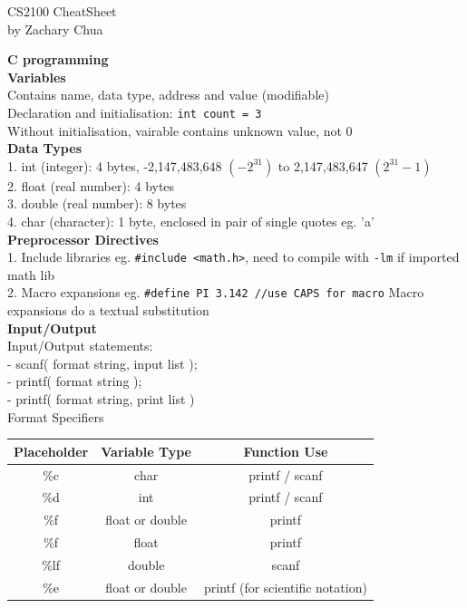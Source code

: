 \documentclass[10pt, a4paper]{article}
\author{Zachary Chua Yan Ern}
\date{16 September 2020}
\begin{document}
	\scriptsize %
	\setlength\parindent{0pt}
	\setlength{\columnseprule}{0.1pt}
	
	\begin{center}
		{\large CS2100 CheatSheet}\\
		by Zachary Chua
	\end{center}
	
	\begin{multicols*}{3}
		
		{\normalsize\textbf{C programming}}\\
		\textbf{Variables}\\
		Contains name, data type, address and value (modifiable)\\
		Declaration and initialisation: \texttt{int count = 3}\\
		Without initialisation, vairable contains unknown value, not 0\\
		
		\textbf{Data Types}\\
		1. int (integer): 4 bytes, -2,147,483,648 $(-2^{31})$ to 2,147,483,647 $(2^{31} - 1)$\\
		2. float (real number): 4 bytes\\
		3. double (real number): 8 bytes\\
		4. char (character): 1 byte, enclosed in pair of single quotes eg. 'a'\\
		
		\textbf{Preprocessor Directives}\\
		1. Include libraries eg. \texttt{\#include <math.h>}, need to compile with \texttt{-lm} if imported math lib\\
		2. Macro expansions eg. \texttt{\#define PI 3.142 //use CAPS for macro}
		Macro expansions do a textual substitution\\
		
		\textbf{Input/Output}\\
		Input/Output statements:\\
		- scanf( format string, input list );\\
		- printf( format string );\\
		- printf( format string, print list )\\
		Format Specifiers\\
		
		\begin{tabular}{ | c | c | c |}
			\hline
			Placeholder & Variable Type & Function Use \\
			\hline
			\%c & char & printf / scanf\\
			\hline
			\%d & int & printf / scanf\\
			\hline
			\%f & float or double & printf \\
			\hline
			\%f & float & printf \\
			\hline
			\%lf & double & scanf \\
			\hline
			\%e & float or double & printf (for scientific notation)\\
			\hline
		\end{tabular}\\
	

\end{multicols*}
\end{document}

